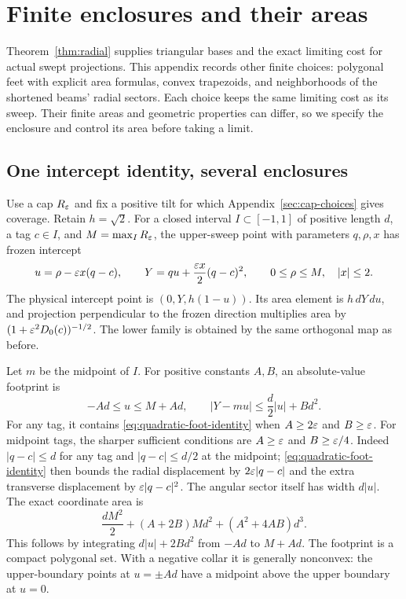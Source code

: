\section{Finite enclosures and their areas}
\label{sec:finite-footprints}

Theorem~\ref{thm:radial} supplies triangular bases and the exact limiting
cost for actual swept projections. This appendix records other finite
choices: polygonal feet with explicit area formulas, convex trapezoids,
and neighborhoods of the shortened beams' radial sectors. Each choice
keeps the same limiting cost as its sweep. Their finite areas and geometric
properties can differ, so we specify the enclosure and control its area
before taking a limit.

\subsection{One intercept identity, several enclosures}

Use a cap $R_\varepsilon$ and fix a positive tilt for which
Appendix~\ref{sec:cap-choices} gives coverage. Retain $h=\sqrt2$.
For a closed interval $I\subset[-1,1]$ of positive length $d$, a tag $c\in I$,
and $M=\max_I R_\varepsilon$, the upper-sweep point with parameters
$q,\rho,x$ has frozen intercept
\begin{equation}\label{eq:quadratic-foot-identity}
 u=\rho-\varepsilon x(q-c),\qquad
 Y=qu+\frac{\varepsilon x}{2}(q-c)^2,
 \qquad 0\le\rho\le M,\quad |x|\le2.
\end{equation}
The physical intercept point is $(0,Y,h(1-u))$. Its area element is
$h\,dY\,du$, and projection perpendicular to the frozen direction
multiplies area by $(1+\varepsilon^2D_0(c))^{-1/2}$. The lower family is
obtained by the same orthogonal map as before.

Let $m$ be the midpoint of $I$. For positive constants $A,B$, an
absolute-value footprint is
\begin{equation}\label{eq:abs-foot-family}
 -Ad\le u\le M+Ad,\qquad
 |Y-mu|\le \frac d2|u|+Bd^2.
\end{equation}
For any tag, it contains \eqref{eq:quadratic-foot-identity} when
$A\ge2\varepsilon$ and $B\ge\varepsilon$. For midpoint tags, the sharper sufficient
conditions are $A\ge\varepsilon$ and $B\ge\varepsilon/4$.
Indeed $|q-c|\le d$ for any tag and $|q-c|\le d/2$ at the midpoint;
\eqref{eq:quadratic-foot-identity} then bounds the radial displacement
by $2\varepsilon|q-c|$ and the extra transverse displacement by
$\varepsilon|q-c|^2$. The angular sector itself has width $d|u|$.
The exact coordinate area is
\begin{equation}\label{eq:abs-foot-area}
 \frac{dM^2}{2}+(A+2B)Md^2+(A^2+4AB)d^3.
\end{equation}
This follows by integrating $d|u|+2Bd^2$ from $-Ad$ to $M+Ad$.
The footprint is a compact polygonal set. With a negative collar it is
generally nonconvex: the upper-boundary points at $u=\pm Ad$ have a
midpoint above the upper boundary at $u=0$.

